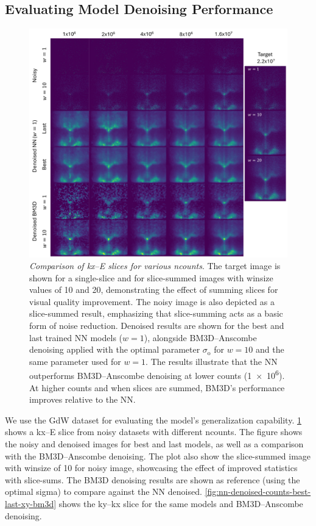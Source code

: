 \subsection{Evaluating Model Denoising Performance}
\begin{figure}
    \centering
    \includegraphics[width=1\linewidth]{images/nn_denoised_counts_best_last_ex_bm3d.pdf}
    \caption{\textit{Comparison of \gls{kx}–\gls{E} slices for various \gls{ncounts}}. The target image is shown for a single-slice and for slice-summed images with \gls{winsize} values of \num{10} and \num{20}, demonstrating the effect of summing slices for visual quality improvement. The noisy image is also depicted as a slice-summed result, emphasizing that slice-summing acts as a basic form of noise reduction. Denoised results are shown for the best and last trained \gls{NN} models ($w=1$), alongside \gls{BM3D}–Anscombe denoising applied with the optimal parameter $\sigma_{\text{o}}$ for $w=10$ and the same parameter used for $w=1$. The results illustrate that the \gls{NN} outperforms BM3D–Anscombe denoising at lower counts (\num{1e6}). At higher counts and when slices are summed, BM3D’s performance improves relative to the \gls{NN}.}
    \label{fig:nn-denoised-counts-best-last-ex-bm3d}
\end{figure}

We use the \gls{GdW} dataset for evaluating the model's generalization capability. \cref{fig:nn-denoised-counts-best-last-ex-bm3d} shows a \gls{kx}--\gls{E} slice from noisy datasets with different \gls{ncounts}. The figure shows the noisy and denoised images for best and last models, as well as a comparison with the \gls{BM3D}--Anscombe denoising. The plot also show the slice-summed image with \gls{winsize} of \num{10} for noisy image, showcasing the effect of improved statistics with slice-sums. The BM3D denoising results are shown as reference (using the optimal sigma) to compare against the \gls{NN} denoised. \cref{fig:nn-denoised-counts-best-last-xy-bm3d} shows the \gls{ky}--\gls{kx} slice for the same models and \gls{BM3D}--Anscombe denoising.

